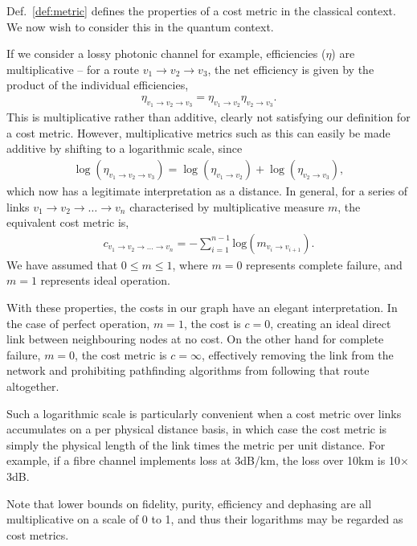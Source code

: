 \documentclass[aps,rmp,twocolumn,amsmath,amssymb,nofootinbib,superscriptaddress,longbibliography,floatfix]{revtex4-1}
\begin{document}
Def.~\ref{def:metric} defines the properties of a cost metric in the classical context. We now wish to consider this in the quantum context.

If we consider a lossy photonic channel for example, efficiencies ($\eta$) are multiplicative -- for a route \mbox{$v_1\to v_2\to v_3$}, the net efficiency is given by the product of the individual efficiencies, \begin{align}
\eta_{v_1\to v_2 \to v_3} = \eta_{v_1\to v_2} \eta_{v_2\to v_3}.
\end{align}
This is multiplicative rather than additive, clearly not satisfying our definition for a cost metric. However, multiplicative metrics such as this can easily be made additive by shifting to a logarithmic scale, since
\begin{align}
\log(\eta_{v_1\to v_2\to v_3}) = \log(\eta_{v_1\to v_2}) + \log(\eta_{v_2\to v_3}),
\end{align}
which now has a legitimate interpretation as a distance. In general, for a series of links \mbox{$v_1\to v_2 \to \dots \to v_n$} characterised by multiplicative measure $m$, the equivalent cost metric is,
\begin{align} \label{eq:dist_log}
c_{v_1\to v_2 \to \dots \to v_n} = -\sum_{i=1}^{n-1} \mathrm{log}(m_{v_i\to v_{i+1}}).
\end{align}
We have assumed that \mbox{$0\leq m \leq 1$}, where \mbox{$m=0$} represents complete failure, and \mbox{$m=1$} represents ideal operation.

With these properties, the costs in our graph have an elegant interpretation. In the case of perfect operation, \mbox{$m=1$}, the cost is \mbox{$c=0$}, creating an ideal direct link between neighbouring nodes at no cost. On the other hand for complete failure, \mbox{$m=0$}, the cost metric is \mbox{$c=\infty$}, effectively removing the link from the network and prohibiting pathfinding algorithms from following that route altogether.

Such a logarithmic scale is particularly convenient when a cost metric over links accumulates on a per physical distance basis, in which case the cost metric is simply the physical length of the link times the metric per unit distance. For example, if a fibre channel implements loss at 3dB/km, the loss over 10km is 10$\times$3dB.

Note that lower bounds on fidelity, purity, efficiency and dephasing are all multiplicative on a scale of 0 to 1, and thus their logarithms may be regarded as cost metrics.
\end{document}
